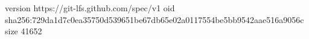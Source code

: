 version https://git-lfs.github.com/spec/v1
oid sha256:729da1d7c0ea35750d539651be67db65e02a0117554be5bb9542aae516a9056c
size 41652
